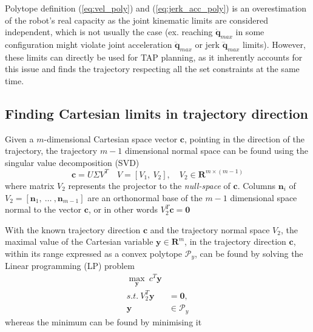 Polytope definition (\ref{eq:vel_poly}) and (\ref{eq:jerk_acc_poly}) is an overestimation of the robot's real capacity as the joint kinematic limits are considered independent, which is not usually the case (ex. reaching $\dot{\bm{q}}_{max}$ in some configuration might violate joint acceleration $\ddot{\bm{q}}_{max}$  or jerk $\dddot{\bm{q}}_{max}$ limits). However, these limits can directly be used for TAP planning, as it inherently accounts for this issue and finds the trajectory respecting all the set constraints at the same time. 

\subsection{Finding Cartesian limits in trajectory direction}
\label{ch:capacity_lp}

Given a $m$-dimensional Cartesian space vector $\bm{c}$, pointing in the direction of the trajectory, the trajectory $m\!-\!1$ dimensional normal space can be found using the singular value decomposition (SVD)
\begin{equation}
    \bm{c} = U\Sigma V^T \quad V = \left[ V_1, ~ V_2\right], \quad V_2 \in \mathbf{R}^{m \times (m-1)}  
\end{equation}
where matrix $V_2$ represents the projector to the \textit{null-space} of $\bm{c}$\cite{klema_singular_1980}. Columns $\bm{n}_i$ of $V_2=\left[\bm{n}_1,~ \ldots~, \bm{n}_{m-1} \right]$ are an orthonormal base of the $m\!-\!1$ dimensional space normal to the vector $\bm{c}$, or in other words $V_2^T\bm{c} = \bm{0}$

With the known trajectory direction $\bm{c}$ and the trajectory normal space $V_2$, the maximal value of the Cartesian variable $\bm{y} \in\mathbf{R}^m$, in the trajectory direction $\bm{c}$, within its range expressed as a convex polytope $\mathcal{P}_y$, can be found by solving the Linear programming (LP) problem\cite{vajda_gass_1964}
\begin{equation}
\begin{split}
    \max_{\bm{y}} ~c^T \bm{y}& \\
    s.t. ~ V_2^T\bm{y} &= \bm{0}, \\
    \bm{y}&\in \mathcal{P}_y
\end{split}\label{eq:lp_general}
\end{equation}
whereas the minimum can be found by minimising it%

